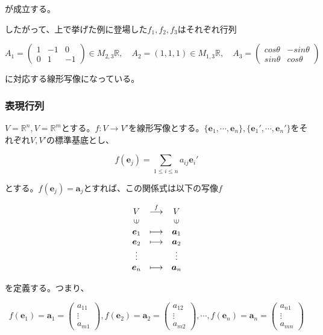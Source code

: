 \documentclass[dvipdfmx,autodetect-engine]{jsarticle}
\newcommand{\vecSpace}[1]{\mathbb{R}^{#1}}
\begin{document}
が成立する。

したがって、上で挙げた例に登場した$f_1, f_2, f_3$はそれぞれ行列

$$
A_1 = \begin{pmatrix}
1 & -1 & 0 \\
0 & 1 & -1
\end{pmatrix} \in M_{2,3}\mathbb{R}, \quad
A_2 = (1, 1, 1) \in M_{1,3}\mathbb{R}, \quad
A_3 = \begin{pmatrix}
cos\theta & -sin\theta \\
sin\theta & cos\theta
\end{pmatrix}
$$

に対応する線形写像になっている。

\subsubsection{表現行列}

$V = \vecSpace{n}, V = \vecSpace{m}$とする。$f: V \to V'$を線形写像とする。$\{\bm{e}_1, \cdots, \bm{e}_n\}, \{\bm{e}_1', \cdots, \bm{e}_n'\}$をそれぞれ$V, V'$の標準基底とし、

$$
f(\bm{e}_j) = \sum_{1 \leq i \leq n} a_{ij}\bm{e}_{i}'
$$

とする。$f(\bm{e}_j) = \bm{a}_j$とすれば、この関係式は以下の写像$f$

$$
\begin{array}{ccc}
V & \stackrel{f}{\longrightarrow}  & V \\
\rotatebox{90}{$\in$} & & \rotatebox{90}{$\in$} \\
\bm{e}_1 & \longmapsto & \bm{a}_1 \\
\bm{e}_2 & \longmapsto & \bm{a}_2 \\
\vdots & & \vdots \\
\bm{e}_n & \longmapsto & \bm{a}_n
\end{array}
$$

を定義する。つまり、

$$
f(\bm{e}_1) = \bm{a}_1 = \begin{pmatrix}
a_{11} \\
\vdots \\
a_{m1}
\end{pmatrix}, 
f(\bm{e}_2) = \bm{a}_2 = \begin{pmatrix}
a_{12} \\
\vdots \\
a_{m2}
\end{pmatrix}, 
\cdots,
f(\bm{e}_n) = \bm{a}_n = \begin{pmatrix}
a_{n1} \\
\vdots \\
a_{mn}
\end{pmatrix}
$$
\end{document}
